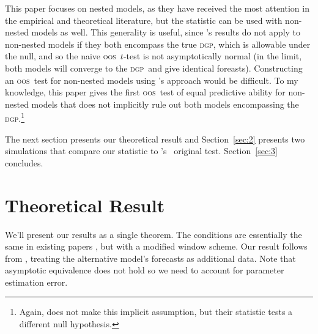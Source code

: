 \documentclass[12pt]{article}
\newcommand\possessivecite[1]{\citeauthor{#1}'s \citeyearpar{#1}}
\newcommand\poscw{\citeauthor{ClW:06}'s \citeyearpar{ClW:06,ClW:07}}
\newcommand{\dgp}{\textsc{dgp}}
\newcommand{\oos}{\textsc{oos}}
\begin{document}
This paper focuses on nested models, as they have received the most
attention in the empirical and theoretical literature, but the
statistic can be used with non-nested models as well.  This generality
is useful, since \possessivecite{Wes:96} results do not apply to
non-nested models if they both encompass the true \dgp, which is
allowable under the null, and so the naive \oos\ $t$-test is not
asymptotically normal (in the limit, both models will converge to the
\dgp\ and give identical foreasts).  Constructing an \oos\ test for
non-nested models using \possessivecite{ClM:01} approach would be
difficult.  To my knowledge, this paper gives the first \oos\ test
of equal predictive ability for non-nested models that does not
implicitly rule out both models encompassing the
\dgp.\footnote{Again, \citet{GiW:06} does not make this implicit
  assumption, but their statistic tests a different null hypothesis.}

The next section presents our theoretical result and
Section~\ref{sec:2} presents two simulations that compare our
statistic to \poscw\ original test.  Section~\ref{sec:3} concludes.

\section{Theoretical Result}\label{sec:1}
We'll present our results as a single theorem.  The conditions are
essentially the same in existing papers
\citep[e.g.][]{ClW:07,ClW:06,Wes:96,WeM:98,Mcc:00,GiW:06}, but with a
modified window scheme.  Our result follows from \citet{Wes:96},
treating the alternative model's forecasts as additional data. Note
that asymptotic equivalence does not hold so we need to account for
parameter estimation error.
\end{document}
